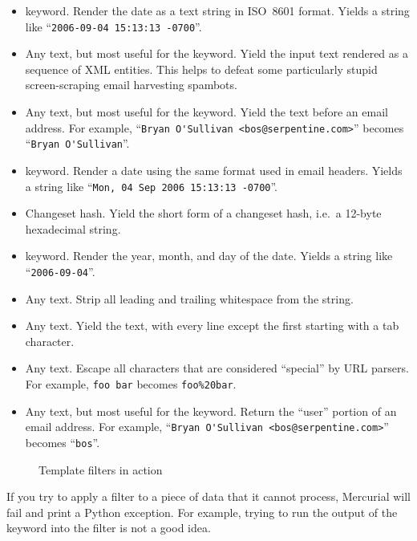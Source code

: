 {{\begin{itemize}
\item[\tplkwfilt{date}{isodate}]  keyword.  Render the
  date as a text string in ISO~8601 format.  Yields a string like
  ``\Verb+2006-09-04 15:13:13 -0700+''.
\item[\tplfilter{obfuscate}] Any text, but most useful for the
   keyword.  Yield the input text rendered as a
  sequence of XML entities.  This helps to defeat some particularly
  stupid screen-scraping email harvesting spambots.
\item[\tplkwfilt{author}{person}] Any text, but most useful for the
   keyword.  Yield the text before an email address.
  For example, ``\Verb+Bryan O'Sullivan <bos@serpentine.com>+''
  becomes ``\Verb+Bryan O'Sullivan+''.
\item[\tplkwfilt{date}{rfc822date}]  keyword.  Render a
  date using the same format used in email headers.  Yields a string
  like ``\Verb+Mon, 04 Sep 2006 15:13:13 -0700+''.
\item[\tplkwfilt{node}{short}] Changeset hash.  Yield the short form
  of a changeset hash, i.e.~a 12-byte hexadecimal string.
\item[\tplkwfilt{date}{shortdate}]  keyword.  Render
  the year, month, and day of the date.  Yields a string like
  ``\Verb+2006-09-04+''.
\item[\tplfilter{strip}] Any text.  Strip all leading and trailing
  whitespace from the string.
\item[\tplfilter{tabindent}] Any text.  Yield the text, with every line
  except the first starting with a tab character.
\item[\tplfilter{urlescape}] Any text.  Escape all characters that are
  considered ``special'' by URL parsers.  For example, \Verb+foo bar+
  becomes \Verb+foo%
\item[\tplkwfilt{author}{user}] Any text, but most useful for the
   keyword.  Return the ``user'' portion of an email
  address.  For example,
  ``\Verb+Bryan O'Sullivan <bos@serpentine.com>+'' becomes
  ``\Verb+bos+''.
\end{itemize}

\begin{figure}
  \caption{Template filters in action}
  \label{fig:template:filters}
\end{figure}

\begin{note}
  If you try to apply a filter to a piece of data that it cannot
  process, Mercurial will fail and print a Python exception.  For
  example, trying to run the output of the  keyword
  into the  filter is not a good idea.
\end{note}

}}
